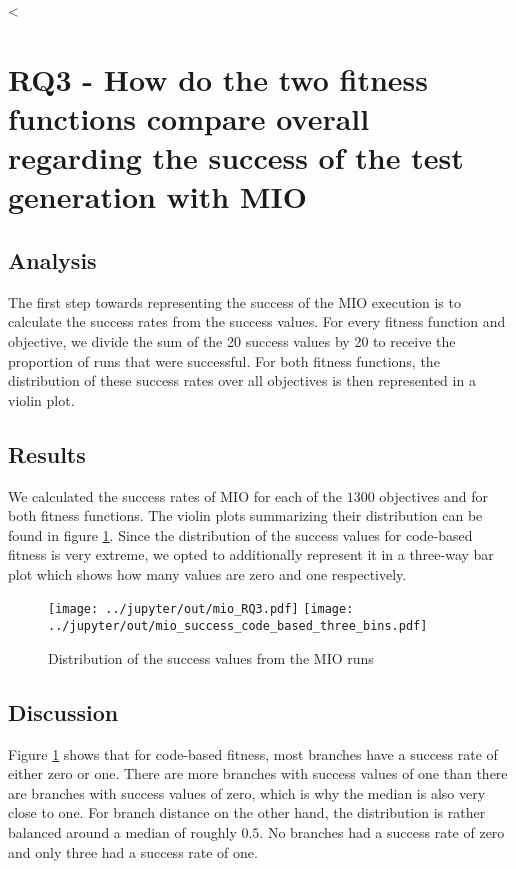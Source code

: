 <\section[RQ3]{RQ3 - How do the two fitness functions compare overall regarding the success of the test generation with MIO}

\subsection{Analysis}

The first step towards representing the success of the MIO execution is to calculate the success rates from the success values.
For every fitness function and objective, we divide the sum of the 20 success values by 20 to receive the proportion of runs that were successful.
For both fitness functions, the distribution of these success rates over all objectives is then represented in a violin plot.

\subsection{Results}

We calculated the success rates of MIO for each of the $1300$ objectives and for both fitness functions.
The violin plots summarizing their distribution can be found in figure \ref{fig:successdist}.
Since the distribution of the success values for code-based fitness is very extreme, we opted to additionally represent it in a three-way bar plot which shows how many values are zero and one respectively.

\begin{figure}[h]
	\texttt{[image: ../jupyter/out/mio\_RQ3.pdf]}
	\texttt{[image: ../jupyter/out/mio\_success\_code\_based\_three\_bins.pdf]}
	\caption{Distribution of the success values from the MIO runs}\label{fig:successdist}
\end{figure}

\subsection{Discussion}

Figure \ref{fig:successdist} shows that for code-based fitness, most branches have a success rate of either zero or one.
There are more branches with success values of one than there are branches with success values of zero, which is why the median is also very close to one.
For branch distance on the other hand, the distribution is rather balanced around a median of roughly $0.5$. No branches had a success rate of zero and only three had a success rate of one.

